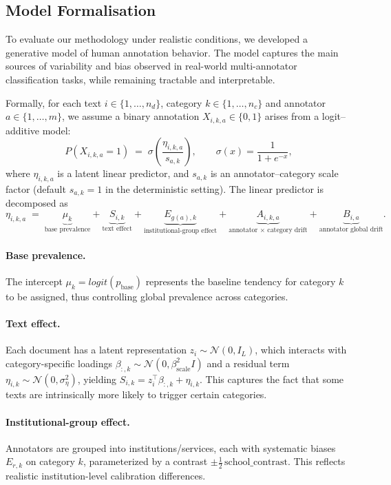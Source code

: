 \documentclass[12pt]{article}
\begin{document}
\subsection{Model Formalisation}
\label{sec:model}


To evaluate our methodology under realistic
conditions, we developed a generative model of human annotation
behavior. The model captures the main sources of
variability and bias observed in real-world multi-annotator
classification tasks, while remaining tractable and interpretable.

Formally, for each text $i \in \{1,\dots,n_d\}$, category
$k \in \{1,\dots,n_c\}$ and annotator $a \in \{1,\dots,m\}$, we assume
a binary annotation $X_{i,k,a} \in \{0,1\}$ arises from a logit–additive
model:
\[
P(X_{i,k,a}=1) \;=\; \sigma\!\left(\frac{\eta_{i,k,a}}{s_{a,k}}\right),
\qquad
\sigma(x) = \frac{1}{1+e^{-x}},
\]
where $\eta_{i,k,a}$ is a latent linear predictor, and $s_{a,k}$
is an annotator--category scale factor (default $s_{a,k}=1$ in the deterministic
setting). The linear predictor is decomposed as
\[
\eta_{i,k,a} \;=\; 
\underbrace{\mu_k}_{\text{base prevalence}} +
\underbrace{S_{i,k}}_{\text{text effect}} +
\underbrace{E_{g(a),k}}_{\text{institutional-group effect}} +
\underbrace{A_{i,k,a}}_{\text{annotator $\times$ category drift}} +
\underbrace{B_{i,a}}_{\text{annotator global drift}} .
\]

\paragraph{Base prevalence.}  
The intercept $\mu_k = logit(p_{\text{base}})$ represents the
baseline tendency for category $k$ to be assigned, thus controlling
global prevalence across categories.

\paragraph{Text effect.}  
Each document has a latent representation $z_i \sim \mathcal{N}(0,I_L)$,
which interacts with category-specific loadings $\beta_{:,k} \sim
\mathcal{N}(0,\beta_{\text{scale}}^2 I)$ and a residual term
$\eta_{i,k} \sim \mathcal{N}(0,\sigma_\eta^2)$, yielding
$S_{i,k} = z_i^\top \beta_{:,k} + \eta_{i,k}$. This captures the fact
that some texts are intrinsically more likely to trigger certain
categories.

\paragraph{Institutional-group effect.}  
Annotators are grouped into institutions/services, each with
systematic biases $E_{r,k}$ on category $k$, parameterized by a
contrast $\pm \tfrac{1}{2}\,\text{school\_contrast}$. This reflects
realistic institution-level calibration differences.
\end{document}
